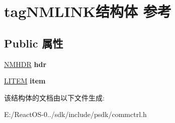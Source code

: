 \hypertarget{structtag_n_m_l_i_n_k}{}\section{tag\+N\+M\+L\+I\+N\+K结构体 参考}
\label{structtag_n_m_l_i_n_k}
\subsection*{Public 属性}
\begin{DoxyCompactItemize}
\item 
\mbox{\label{structtag_n_m_l_i_n_k_ab20c4c9c1c62c373f805b67b5c3d5e58}} 
\hyperlink{structtag_n_m_h_d_r}{N\+M\+H\+DR} {\bfseries hdr}
\item 
\mbox{\label{structtag_n_m_l_i_n_k_a3d37d2141152aaaad4f037c0edbe11fc}} 
\hyperlink{structtag_l_i_t_e_m}{L\+I\+T\+EM} {\bfseries item}
\end{DoxyCompactItemize}


该结构体的文档由以下文件生成\+:\begin{DoxyCompactItemize}
\item 
E\+:/\+React\+O\+S-\/0../sdk/include/psdk/commctrl.\+h\end{DoxyCompactItemize}
